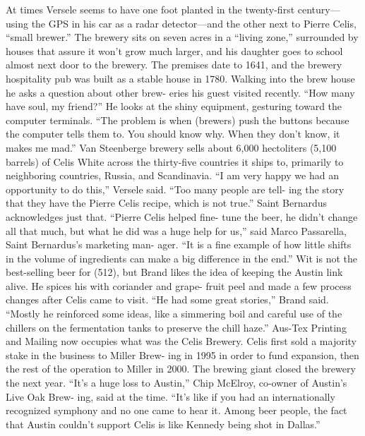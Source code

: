 \documentclass[a4paper,parskip=half]{scrartcl}
\begin{document}
At times Versele seems to have one foot planted in the twenty-first
century—using the GPS in his car as a radar detector—and the other
next to Pierre Celis, “small brewer.” The brewery sits on seven acres in
a “living zone,” surrounded by houses that assure it won’t grow much
larger, and his daughter goes to school almost next door to the brewery.
The premises date to 1641, and the brewery hospitality pub was built as
a stable house in 1780.
Walking into the brew house he asks a question about other brew-
eries his guest visited recently. “How many have soul, my friend?” He
looks at the shiny equipment, gesturing toward the computer terminals.
“The problem is when (brewers) push the buttons because the computer
tells them to. You should know why. When they don’t know, it makes
me mad.”
Van Steenberge brewery sells about 6,000 hectoliters (5,100 barrels)
of Celis White across the thirty-five countries it ships to, primarily to
neighboring countries, Russia, and Scandinavia. “I am very happy we
had an opportunity to do this,” Versele said. “Too many people are tell-
ing the story that they have the Pierre Celis recipe, which is not true.”
Saint Bernardus acknowledges just that. “Pierre Celis helped fine-
tune the beer, he didn’t change all that much, but what he did was a huge
help for us,” said Marco Passarella, Saint Bernardus’s marketing man-
ager. “It is a fine example of how little shifts in the volume of ingredients
can make a big difference in the end.”
Wit is not the best-selling beer for (512), but Brand likes the idea of
keeping the Austin link alive. He spices his with coriander and grape-
fruit peel and made a few process changes after Celis came to visit. “He
had some great stories,” Brand said. “Mostly he reinforced some ideas,
like a simmering boil and careful use of the chillers on the fermentation
tanks to preserve the chill haze.”
Aus-Tex Printing and Mailing now occupies what was the Celis
Brewery. Celis first sold a majority stake in the business to Miller Brew-
ing in 1995 in order to fund expansion, then the rest of the operation to
Miller in 2000. The brewing giant closed the brewery the next year. “It’s a
huge loss to Austin,” Chip McElroy, co-owner of Austin’s Live Oak Brew-
ing, said at the time. “It’s like if you had an internationally recognized
symphony and no one came to hear it. Among beer people, the fact that
Austin couldn’t support Celis is like Kennedy being shot in Dallas.”

\parencite[56]{Hieronymus2010}
\end{document}
